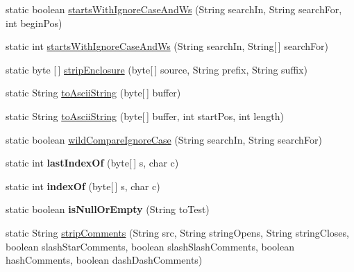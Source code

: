 \begin{DoxyCompactItemize}
\item 
static boolean \mbox{\hyperlink{classcom_1_1mysql_1_1cj_1_1util_1_1_string_utils_a9e333e061facfdfad33dd7d86aba5c58}{starts\+With\+Ignore\+Case\+And\+Ws}} (String search\+In, String search\+For, int begin\+Pos)
\item 
static int \mbox{\hyperlink{classcom_1_1mysql_1_1cj_1_1util_1_1_string_utils_aae0e1f4ae3e82601eec8db89d23634ef}{starts\+With\+Ignore\+Case\+And\+Ws}} (String search\+In, String\mbox{[}$\,$\mbox{]} search\+For)
\item 
static byte \mbox{[}$\,$\mbox{]} \mbox{\hyperlink{classcom_1_1mysql_1_1cj_1_1util_1_1_string_utils_a4ce78d0db6bb767b84a604d8c41f4450}{strip\+Enclosure}} (byte\mbox{[}$\,$\mbox{]} source, String prefix, String suffix)
\item 
static String \mbox{\hyperlink{classcom_1_1mysql_1_1cj_1_1util_1_1_string_utils_ab4259729318332e6bffcd39100e499aa}{to\+Ascii\+String}} (byte\mbox{[}$\,$\mbox{]} buffer)
\item 
static String \mbox{\hyperlink{classcom_1_1mysql_1_1cj_1_1util_1_1_string_utils_a304c08b0fb33f8644e7a335315620be4}{to\+Ascii\+String}} (byte\mbox{[}$\,$\mbox{]} buffer, int start\+Pos, int length)
\item 
static boolean \mbox{\hyperlink{classcom_1_1mysql_1_1cj_1_1util_1_1_string_utils_aeb82746eacaf9c0a68d1aae01c8719c3}{wild\+Compare\+Ignore\+Case}} (String search\+In, String search\+For)
\item 
\mbox{\label{classcom_1_1mysql_1_1cj_1_1util_1_1_string_utils_a6eaaf0103913b8b7a82858ae20acf001}} 
static int {\bfseries last\+Index\+Of} (byte\mbox{[}$\,$\mbox{]} s, char c)
\item 
\mbox{\label{classcom_1_1mysql_1_1cj_1_1util_1_1_string_utils_aabc7d8d476e741e26b48c2e73a7d35c5}} 
static int {\bfseries index\+Of} (byte\mbox{[}$\,$\mbox{]} s, char c)
\item 
\mbox{\label{classcom_1_1mysql_1_1cj_1_1util_1_1_string_utils_a10a2950c2079e853d170db95ea0b800c}} 
static boolean {\bfseries is\+Null\+Or\+Empty} (String to\+Test)
\item 
static String \mbox{\hyperlink{classcom_1_1mysql_1_1cj_1_1util_1_1_string_utils_a116f3a40fdeca32a4e97256d471ff31a}{strip\+Comments}} (String src, String string\+Opens, String string\+Closes, boolean slash\+Star\+Comments, boolean slash\+Slash\+Comments, boolean hash\+Comments, boolean dash\+Dash\+Comments)

\end{DoxyCompactItemize}
